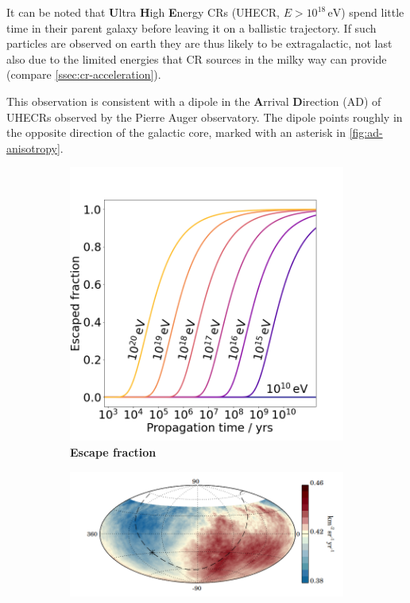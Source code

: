 It can be noted that \textbf{U}ltra \textbf{H}igh \textbf{E}nergy CRs (UHECR, $E>10^{18}\,\text{eV}$) spend little time in their parent galaxy before leaving it on
a ballistic trajectory. If such particles are observed on earth they are thus likely to be extragalactic, not last also due to the limited energies that CR sources 
in the milky way can provide (compare \autoref{ssec:cr-acceleration}).

This observation is consistent with a dipole in the \textbf{A}rrival \textbf{D}irection (AD) of UHECRs observed by the Pierre Auger observatory. The dipole points
roughly in the opposite direction of the galactic core, marked with an asterisk in \autoref{fig:ad-anisotropy}.

\begin{figure}[H]
	\begin{subfigure}[b]{0.32\textwidth}
		\centering
		\includegraphics[width=\textwidth]{./plots/galactic_diffusion.png}
		\caption{\textbf{Escape fraction}}
		\label{fig:escape-fraction}
	\end{subfigure}
	\hfill
	\begin{subfigure}[b]{0.68\textwidth}
		\centering
		\includegraphics[width=\textwidth]{./plots/auger_dipole.png}

\end{subfigure}
\end{figure}
